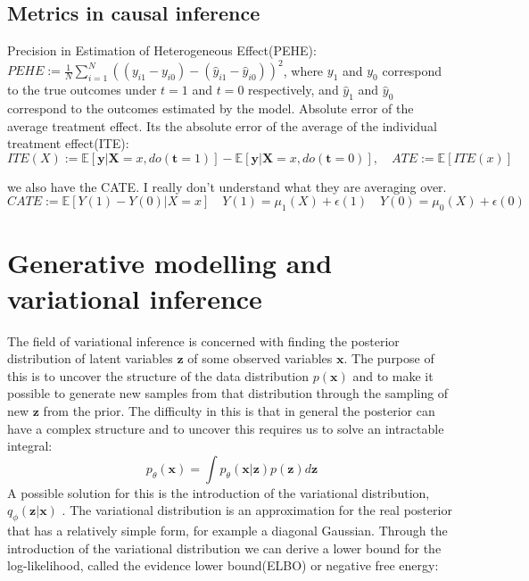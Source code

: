 \documentclass{report}
\newcommand{\E}{\mathbb{E}}
\newcommand{\bt}{\mathbf{t}}
\newcommand{\bX}{\mathbf{X}}
\newcommand{\bx}{\mathbf{x}}
\newcommand{\by}{\mathbf{y}}
\newcommand{\bz}{\mathbf{z}}
\begin{document}
\subsection{Metrics in causal inference}
Precision in Estimation of Heterogeneous Effect(PEHE): $PEHE := \frac{1}{N}\sum\limits^N_{i=1}((y_{i1} - y_{i0}) - (\hat{y}_{i1} - \hat{y}_{i0}))^2$, where $y_1$ and $y_0$ correspond to the true outcomes under $t=1$ and $t=0$ respectively, and $\hat{y}_1$ and $\hat{y}_0$ correspond to the outcomes estimated by the model. 
Absolute error of the average treatment effect. Its the absolute error of the average of the individual treatment effect(ITE): 
\begin{equation}
    ITE(X) := \E[\by | \bX=x, do(\bt=1)] - \E[\by | \bX=x, do(\bt=0)], \quad ATE := \E[ITE(x)]
\end{equation}

we also have the CATE. I really don't understand what they are averaging over.
\begin{equation}
    CATE := \E[Y(1) - Y(0) | X=x] \quad Y(1) = \mu_1(X) + \epsilon(1) \quad Y(0) = \mu_0(X) + \epsilon(0)
\end{equation}


\section{Generative modelling and variational inference}
The field of variational inference is concerned with finding the posterior distribution of latent variables $\bz$ of some observed variables $\bx$. The purpose of this is to uncover the structure of the data distribution $p(\bx)$ and to make it possible to generate new samples from that distribution through the sampling of new $\bz$ from the prior\cite{bishop2006pattern}. The difficulty in this is that in general the posterior can have a complex structure and to uncover this requires us to solve an intractable integral:
\begin{equation}
    p_\theta(\bx) = \int p_\theta(\bx|\bz)p(\bz) d\bz
\end{equation}
A possible solution for this is the introduction of the variational distribution, $q_\phi(\bz|\bx)$ \cite{bishop2006pattern}. The variational distribution is an approximation for the real posterior that has a relatively simple form, for example a diagonal Gaussian. Through the introduction of the variational distribution we can derive a lower bound for the log-likelihood, called the evidence lower bound(ELBO) or negative free energy:
\end{document}
